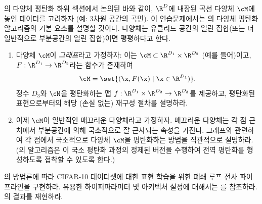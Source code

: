 \documentclass[../../book-main_ko.tex]{subfiles}
\begin{document}
\begin{exercise}
  의 다양체 평탄화 하위 섹션에서 논의된 바와 같이, $\R^D$에 내장된 곡선 다양체 $\cM$에 놓인 데이터를 고려하자 (예: $3$차원 공간의 곡면).
  이 연습문제에서는 \cite{Psenka-JMLR24}의 다양체 평탄화 알고리즘의 기본 요소를 설명할 것이다.
  다양체는 유클리드 공간의 열린 집합(또는 더 일반적으로 부분공간의 열린 집합)이면 평평하다고 한다.

  \begin{enumerate}
    	
\item 다양체 $\cM$이 \textit{그래프}라고 가정하자: 이는 $\cM
      \subset \R^{D_1} \times \R^{D_2}$ (예를 들어)이고, $F
      : \R^{D_1} \to \R^{D_2}$라는 함수가 존재하여
      \begin{equation}
        \cM = \set{(\x, F(\x) \mid \x \in \R^{D_1})}.
      \end{equation}
      정수 $D_3$와 $\cM$을 평탄화하는 맵 $f : \R^{D_1} \times \R^{D_2} \to \R^{D_3}$를 제공하고, 평탄화된 표현으로부터의 해당 (손실 없는) 재구성 절차를 설명하라.
    	
\item 이제 $\cM$이 일반적인 매끄러운 다양체라고 가정하자. 매끄러운 다양체는 각 점 근처에서 부분공간에 의해 국소적으로 잘 근사되는 속성을 가진다. 그래프와 관련하여 각 점에서 국소적으로 다양체 $\cM$을 평탄화하는 방법을 직관적으로 설명하라. (\cite{Psenka-JMLR24}의 알고리즘은 이 국소 평탄화 과정의 정제된 버전을 수행하여 전역 평탄화를 형성하도록 접착할 수 있도록 한다.)
  \end{enumerate}
\end{exercise}

\begin{exercise}[폐쇄 루프 전사 재현]
  의 방법론에 따라 CIFAR-10 데이터셋에 대한 표현 학습을 위한 폐쇄 루프 전사 파이프라인을 구현하라.
  유용한 하이퍼파라미터 및 아키텍처 설정에 대해서는 \cite{Dai-entropy-2022}를 참조하라. 의 결과를 재현하라.
\end{exercise}
\end{document}
